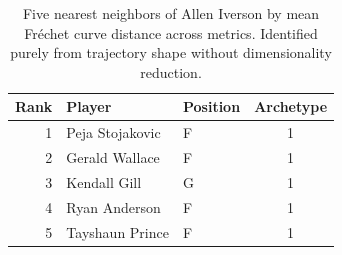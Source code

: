 \begin{table}[htbp]
  \centering\small
  \begin{tabular}{rllc}
    \toprule
    Rank & Player & Position & Archetype \\
    \midrule
    1 & Peja Stojakovic & F & 1 \\
    2 & Gerald Wallace & F & 1 \\
    3 & Kendall Gill & G & 1 \\
    4 & Ryan Anderson & F & 1 \\
    5 & Tayshaun Prince & F & 1 \\
    \bottomrule
  \end{tabular}
  \caption{Five nearest neighbors of Allen Iverson by mean Fr\'{e}chet curve distance across metrics. Identified purely from trajectory shape without dimensionality reduction.}
  \label{tab:Allen_Iverson_frechet_curve_neighbors}
\end{table}

